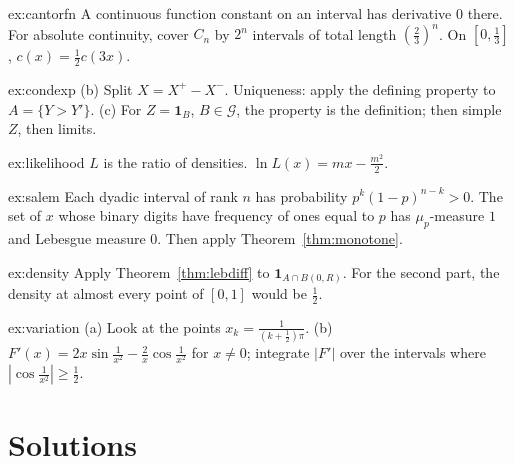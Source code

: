 \begin{hint}{ex:cantorfn}
A continuous function constant on an interval has derivative $0$ there. For absolute continuity, cover $C_n$ by $2^n$ intervals of total length $(\frac23)^n$. On $[0,\frac13]$, $c(x)=\frac12c(3x)$.
\end{hint}
\begin{hint}{ex:condexp}
(b) Split $X=X^+-X^-$. Uniqueness: apply the defining property to $A=\{Y>Y'\}$. (c) For $Z=\mathbf 1_B$, $B\in\mathcal G$, the property is the definition; then simple $Z$, then limits.
\end{hint}
\begin{hint}{ex:likelihood}
$L$ is the ratio of densities. $\ln L(x)=mx-\frac{m^2}2$.
\end{hint}
\begin{hint}{ex:salem}
Each dyadic interval of rank $n$ has probability $p^k(1-p)^{n-k}>0$. The set of $x$ whose binary digits have frequency of ones equal to $p$ has $\mu_p$-measure $1$ and Lebesgue measure $0$. Then apply
Theorem~\ref{thm:monotone}.
\end{hint}
\begin{hint}{ex:density}
Apply Theorem~\ref{thm:lebdiff} to $\mathbf 1_{A\cap B(0,R)}$. For the second part, the density at almost every point of $[0,1]$ would be $\frac12$.
\end{hint}
\begin{hint}{ex:variation}
(a) Look at the points $x_k=\frac1{(k+\frac12)\pi}$. (b) $F'(x)=2x\sin\frac1{x^2}-\frac2x\cos\frac1{x^2}$ for $x\ne0$; integrate $|F'|$ over the intervals where $|\cos\frac1{x^2}|\ge\frac12$.
\end{hint}

\section{Solutions}

